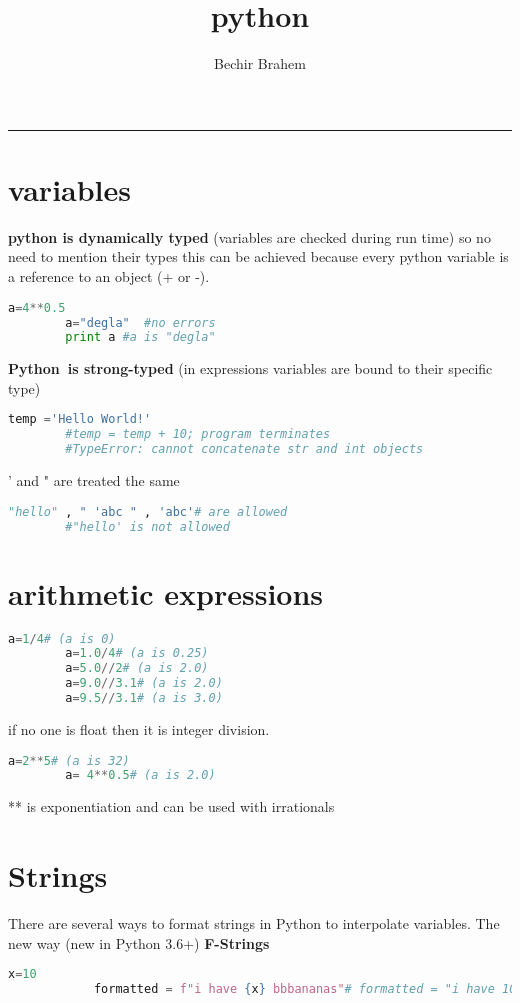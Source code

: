 \documentclass[10pt]{article}
\begin{document}
\title{python}
\author{Bechir Brahem}
\date{\vspace{-5ex}}
\maketitle


\par\noindent\rule{\textwidth}{3pt}
\section{variables }
\textbf{python is dynamically typed} (variables are checked during run time) so no need to mention their types this can be achieved because every python variable is a reference to an object (+ or -).
\begin{lstlisting}[language=Python]
		a=4**0.5
		a="degla"  #no errors
		print a #a is "degla"
\end{lstlisting}
\textbf{Python is strong-typed} (in expressions variables are bound to their specific type)
\begin{lstlisting}[language=Python]
		temp ='Hello World!'
		#temp = temp + 10; program terminates
		#TypeError: cannot concatenate str and int objects
\end{lstlisting}
' and " are treated the same
\begin{lstlisting}[language=Python]
		"hello" , " 'abc " , 'abc'# are allowed
		#"hello' is not allowed
\end{lstlisting}
\section{arithmetic expressions}
\begin{lstlisting}[language=Python]
		a=1/4# (a is 0)
		a=1.0/4# (a is 0.25)
		a=5.0//2# (a is 2.0)
		a=9.0//3.1# (a is 2.0)
		a=9.5//3.1# (a is 3.0)
\end{lstlisting}
if no one is float then it is integer division.
\begin{lstlisting}[language=Python]
		a=2**5# (a is 32)
		a= 4**0.5# (a is 2.0)
\end{lstlisting}
** is exponentiation and can be used with irrationals
\section{Strings}
There are several ways to format strings in Python to interpolate variables.
The new way (new in Python 3.6+) \textbf{F-Strings}
\begin{lstlisting}[language=Python]
			x=10
			formatted = f"i have {x} bbbananas"# formatted = "i have 10 bbbananas"
\end{lstlisting}
\end{document}
